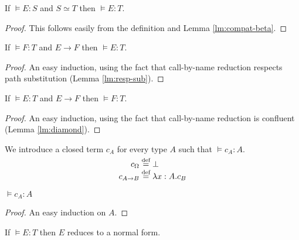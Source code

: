 \documentclass[a4paper,UKenglish]{lipics-v2016}
\newcommand*{\eqdef}{\mathrel{\smash{\stackrel{\text{def}}{=}}}}
\theoremstyle{plain}
\theoremstyle{definition}
\begin{document}
\begin{lemma}[Conversion]
\label{lm:conv-compute}
If $\models E : S$ and $S \simeq T$ then $\models E : T$.
\end{lemma}

\begin{proof}
This follows easily from the definition and Lemma \ref{lm:compat-beta}.
\end{proof}

\begin{lemma}[Expansion]
\label{lm:expansion}
If $\models F : T$ and $E \rightarrow F$ then $\models E : T$.
\end{lemma}

\begin{proof}
An easy induction, using the fact that call-by-name reduction respects path substitution (Lemma \ref{lm:resp-sub}).
\end{proof}

\begin{lemma}[Reduction]
\label{lm:reduction}
If $\models E : T$ and $E \rightarrow F$ then $\models F : T$.
\end{lemma}

\begin{proof}
An easy induction, using the fact that call-by-name reduction is confluent (Lemma \ref{lm:diamond}).
\end{proof}

\begin{definition}
We introduce a closed term $c_A$ for every type $A$ such that $\models c_A : A$.
\begin{align*}
c_\Omega & \eqdef \bot \\
c_{A \rightarrow B} & \eqdef \lambda x:A.c_B
\end{align*}
\end{definition}

\begin{lemma}
$\models c_A : A$
\end{lemma}

\begin{proof}
An easy induction on $A$.
\end{proof}

\begin{lemma}
If $\models E : T$ then $E$ reduces to a normal form.
\end{lemma}
\end{document}
